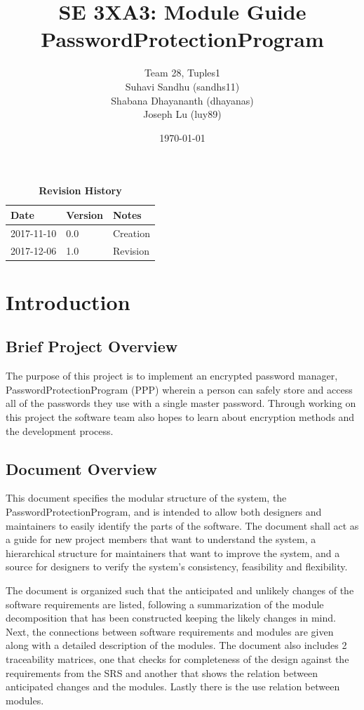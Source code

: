 \documentclass[12pt, titlepage]{article}
\title{SE 3XA3: Module Guide\\PasswordProtectionProgram}
\author{Team 28, Tuples1
		\\ Suhavi Sandhu (sandhs11)
		\\ Shabana Dhayananth (dhayanas)
		\\ Joseph Lu (luy89)
}
\date{\today}
\begin{document}
\maketitle

\tableofcontents
\listoftables
\listoffigures

\begin{table}[bp]
\caption{\bf Revision History}
\begin{tabularx}{\textwidth}{p{3cm}p{2cm}X}
\toprule {\bf Date} & {\bf Version} & {\bf Notes}\\
\midrule
2017-11-10 & 0.0 & Creation\\
2017-12-06 & 1.0 & Revision\\
\bottomrule
\end{tabularx}
\end{table}

\newpage


\section{Introduction}\label{Intro}

\subsection{Brief Project Overview} \label{ProjOver}
The purpose of this project is to implement an encrypted password manager, PasswordProtectionProgram (PPP) wherein a person can 
safely store and access all of the passwords they use with a single master password. Through working on this project the software 
team also hopes to learn about encryption methods and the development process.

\subsection{Document Overview} \label{DocOver}
This document specifies the modular structure of the system, the 
PasswordProtectionProgram, and is intended to allow both designers and 
maintainers to easily identify the parts of the software. The document 
shall act as a guide for new project members that want to understand 
the system, a hierarchical structure for maintainers that want to 
improve the system, and a source for designers to verify the system’s 
consistency, feasibility and flexibility.

The document is organized such that the anticipated and unlikely 
changes of the software requirements are listed, following a 
summarization of the module decomposition that has been constructed 
keeping the likely changes in mind. Next, the connections between 
software requirements and modules are given along with a detailed 
description of the modules. The document also includes 2 traceability 
matrices, one that checks for completeness of the design against the 
requirements from the SRS and another that shows the relation between 
anticipated changes and the modules. Lastly there is the use relation 
between modules.
\end{document}
